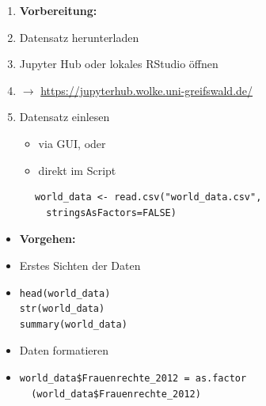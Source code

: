 \documentclass[aspectratio=169, journal, x11names, unknownkeysallowed, hyperref={colorlinks,
linkcolor = SS2,
urlcolor  = F3,
citecolor = F3,
anchorcolor = A4}, 12pt]{beamer}
\newcommand{\oarrow}{\textcolor{A1}{$\rightarrow$} }
\begin{document}
    \begin{frame}[t, fragile]
      \begin{minipage}[t]{0.45\textwidth}
          \begin{enumerate}
              \item[] \textbf{Vorbereitung:}
              \item Datensatz herunterladen
              \item Jupyter Hub oder lokales RStudio öffnen 
              \item[] \oarrow \url{https://jupyterhub.wolke.uni-greifswald.de/}
              \item Datensatz einlesen
              \begin{itemize}
                \item via GUI, oder
                \item direkt im Script
              \end{itemize}
          \end{enumerate}
            \begin{lstlisting}
      world_data <- read.csv("world_data.csv",
        stringsAsFactors=FALSE)
            \end{lstlisting}
        \end{minipage}
        \begin{minipage}[t]{0.45\textwidth}
          \begin{itemize}[<+(-1)->]
            \item[] \textbf{Vorgehen:} 
            \item Erstes Sichten der Daten
            \item[] \begin{lstlisting}
head(world_data)
str(world_data)
summary(world_data)
            \end{lstlisting}
            \item Daten formatieren
            \item[] \begin{lstlisting}
world_data$Frauenrechte_2012 = as.factor
  (world_data$Frauenrechte_2012)
            \end{lstlisting}
          \end{itemize}
        \end{minipage}
    \end{frame}
\end{document}
